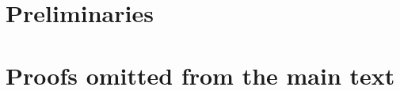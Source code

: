 \documentclass[reqno]{amsart}
\numberwithin{equation}{section}  %
\theoremstyle{plain}
\theoremstyle{definition}
\theoremstyle{remark}
\numberwithin{theorem}{section}
\numberwithin{remark}{section}
\numberwithin{example}{section}
\begin{document}
\maketitle










\section{Preliminaries}
\label{sec:preliminaries}





%




\appendix



\section{Proofs omitted from the main text}
\label{appendix:proofs}





\end{document}
